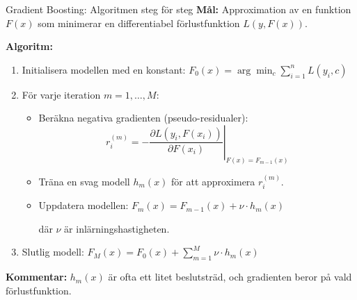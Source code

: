 \documentclass[10pt,english]{beamer}
\begin{document}
\begin{frame}{Gradient Boosting: Algoritmen steg för steg}
  \textbf{Mål:} Approximation av en funktion $F(x)$ som minimerar en differentiabel förlustfunktion $L(y, F(x))$.


  \textbf{Algoritm:}
  \begin{enumerate}
    \item Initialisera modellen med en konstant: $F_0(x) = \arg\min_c \sum_{i=1}^n L(y_i, c)$
     \vspace{0.1cm}
    \item För varje iteration $m = 1, \dots, M$:
    \begin{itemize}
      \item Beräkna negativa gradienten (pseudo-residualer):
      \[
        r_i^{(m)} = -\left.\frac{\partial L(y_i, F(x_i))}{\partial F(x_i)}\right|_{F(x) = F_{m-1}(x)}
      \]
      
      \item Träna en svag modell $h_m(x)$ för att approximera $r_i^{(m)}$.
      
      \item Uppdatera modellen: $F_m(x) = F_{m-1}(x) + \nu \cdot h_m(x)$

      där $\nu$ är inlärningshastigheten.
    \end{itemize}
     \vspace{0.1cm}
    
    \item Slutlig modell: $F_M(x) = F_0(x) + \sum_{m=1}^M \nu \cdot h_m(x)$

  \end{enumerate}

  
  \textbf{Kommentar:} $h_m(x)$ är ofta ett litet beslutsträd, och gradienten beror på vald förlustfunktion.
\end{frame}
\end{document}
